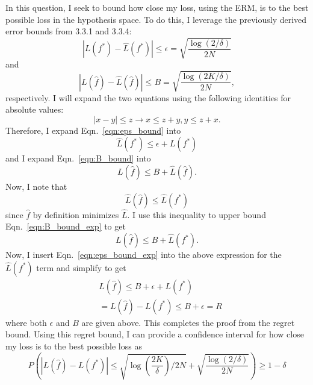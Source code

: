 \documentclass[12pt]{amsart}
\begin{document}
In this question, I seek to bound how close my loss, using the ERM, is to the best possible loss in the hypothesis space.  To do this, I leverage the previously derived error bounds from 3.3.1 and 3.3.4:
\begin{equation} \label{eqn:eps_bound}
|L(f^*) - \hat{L}(f^*)| \leq \epsilon = \sqrt{\frac{\log(2/\delta)}{2N}}
\end{equation}
and
\begin{equation} \label{eqn:B_bound}
|L(\hat{f}) - \hat{L}(\hat{f})| \leq B = \sqrt{\frac{\log(2K/\delta)}{2N}},
\end{equation}
respectively.  I will expand the two equations using the following identities for absolute values:
\begin{equation*}
|x - y| \leq z \rightarrow x \leq z + y, y \leq z + x.
\end{equation*}
Therefore, I expand Eqn.~\ref{eqn:eps_bound} into 
\begin{equation} \label{eqn:eps_bound_exp}
\hat{L}(f^*) \leq \epsilon + L(f^*)
\end{equation}
and I expand Eqn.~\ref{eqn:B_bound} into
\begin{equation} \label{eqn:B_bound_exp}
L(\hat{f}) \leq B + \hat{L}(\hat{f}).
\end{equation}
Now, I note that
\begin{equation*}
\hat{L}(\hat{f}) \leq \hat{L}(f^*)
\end{equation*}
since $\hat{f}$ by definition minimizes $\hat{L}$.  I use this inequality to upper bound Eqn.~\ref{eqn:B_bound_exp} to get
\begin{equation}
L(\hat{f}) \leq B + \hat{L}(f^*).
\end{equation}
Now, I insert Eqn.~\ref{eqn:eps_bound_exp} into the above expression for the $\hat{L}(f^*)$ term and simplify to get
\begin{equation}
\begin{split}
& L(\hat{f}) \leq B + \epsilon + L(f^*) \\
& = L(\hat{f}) - L(f^*) \leq B + \epsilon = R
\end{split}
\end{equation}
where both $\epsilon$ and $B$ are given above.  This completes the proof from the regret bound.  Using this regret bound, I can provide a confidence interval for how close my loss is to the best possible loss as
\begin{equation}
P(|L(\hat{f}) - L(f^*)| \leq \sqrt{\log(\frac{2K}{\delta})/2N} + \sqrt{\frac{\log(2/\delta)}{2N}}) \geq 1 - \delta
\end{equation}
\end{document}
